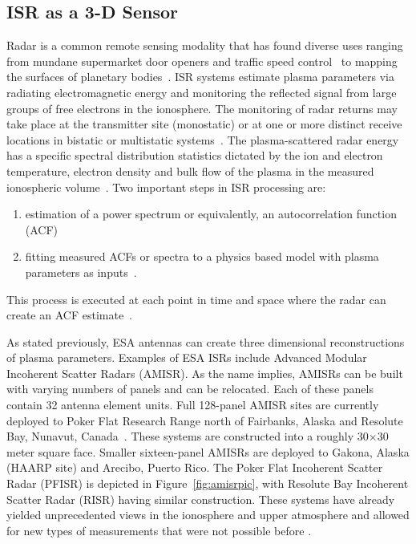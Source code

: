 \subsection{ISR as a 3-D Sensor}
Radar is a common remote sensing modality that has found diverse uses ranging from mundane supermarket door openers and traffic speed control~\citep{richards2010principles} to mapping the surfaces of planetary bodies~\citep{campbell2002radar}. ISR systems estimate plasma parameters via radiating electromagnetic energy and monitoring the reflected signal from large groups of free electrons in the ionosphere. The monitoring of radar returns may take place at the transmitter site (monostatic) or at one or more distinct receive locations in bistatic or multistatic systems~\citep{RDS:RDS2903}. The plasma-scattered radar energy has a specific spectral distribution statistics dictated by the ion and electron temperature, electron density and bulk flow of the plasma in the measured ionospheric volume~\citep{dougherty:farley1960,farleydougherty:ISR2,doughteryfarley:ISR3,hagfors1961}. Two important steps in ISR processing are:
\begin{enumerate}
\item estimation of a power spectrum or equivalently, an autocorrelation function (ACF)~\citep{farley1969}
\item fitting measured ACFs or spectra to a physics based model with plasma parameters as inputs~\citep{RDS:RDS1387}.
\end{enumerate}
This process is executed at each point in time and space where the radar can create an ACF estimate~\citep{nikoukar2008}. 

As stated previously, ESA antennas can create three dimensional reconstructions of plasma parameters. Examples of ESA ISRs include Advanced Modular Incoherent Scatter Radars (AMISR).
As the name implies, AMISRs can be built with varying numbers of panels and can be relocated. Each of these panels contain 32 antenna element units.
Full 128-panel AMISR sites are currently deployed to Poker Flat Research Range north of Fairbanks, Alaska and Resolute Bay, Nunavut, Canada~\citep{Semeter2009738,Valentic:2013jg,Nicolls2015a}. These systems are constructed into a roughly 30$\times$30 meter square face.
Smaller sixteen-panel AMISRs are deployed to Gakona, Alaska (HAARP site) and Arecibo, Puerto Rico.
The Poker Flat Incoherent Scatter Radar (PFISR) is depicted in Figure~\ref{fig:amisrpic}, with Resolute Bay Incoherent Scatter Radar (RISR) having similar construction. 
These systems have already yielded unprecedented views in the ionosphere and upper atmosphere and allowed for new types of measurements that were not possible before \citep{semeter:jgr2010,butler:imagingfregiondrifts,Nicolls:2007ie}. %

